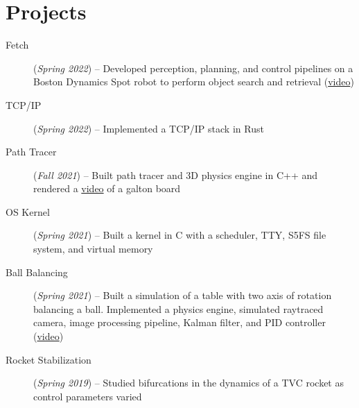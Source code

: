 \documentclass[letterpaper,11pt]{article}
\makeatletter
\newcommand{\resumeItem}[2]{
  \item\small{
    \textbf{#1}{#2 \vspace{-5pt}}
  }
}
\newcommand{\resumeSubheadingSimple}[2]{
  \vspace{-1pt}\item
    \begin{tabular*}{0.97\textwidth}{l@{\extracolsep{\fill}}r}
      \textbf{#1} & \textit{\small#2}\\
    \end{tabular*}\vspace{-3pt}
}
\newcommand{\resumeItemListStart}{\begin{itemize}}
\newcommand{\resumeItemListEnd}{\end{itemize}}
\makeatother
\begin{document}
\section{Projects}
\vspace{3pt}
\small{
\begin{description}
  \item[Fetch] (\textit{Spring 2022}) -- Developed perception, planning, and control pipelines on a Boston Dynamics Spot robot to perform object search and retrieval (\href{https://youtu.be/IvIS-P1sRSk}{video})
  \item[TCP/IP] (\textit{Spring 2022}) -- Implemented a TCP/IP stack in Rust
  \item[Path Tracer] (\textit{Fall 2021}) -- Built path tracer and 3D physics engine in C++ and rendered a \href{https://youtu.be/wIA1xijYGs0}{video} of a galton board
  \item[OS Kernel] (\textit{Spring 2021}) -- Built a kernel in C with a scheduler, TTY, S5FS file system, and virtual memory
  \item[Ball Balancing] (\textit{Spring 2021}) -- Built a simulation of a table with two axis of rotation balancing a ball. Implemented a physics engine, simulated raytraced camera, image processing pipeline, Kalman filter, and PID controller (\href{https://youtu.be/TIc4otyw-zQ}{video})
  \item[Rocket Stabilization] (\textit{Spring 2019}) -- Studied bifurcations in the dynamics of a TVC rocket as control parameters varied

\end{description}
}
\end{document}
